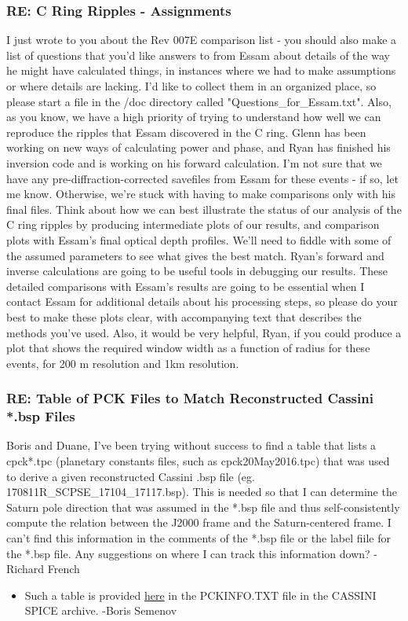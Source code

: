 \documentclass[crop=false,class=article,oneside]{standalone}
\begin{document}
\subsubsection{\footnotesize RE: C Ring Ripples - Assignments}
I just wrote to you about the Rev 007E comparison list - you should also make a list of questions that you'd like answers to from Essam about details of the way he might have calculated things, in instances where we had to make assumptions or where details are lacking. I'd like to collect them in an organized place, so please start a file in the /doc directory called "Questions\_for\_Essam.txt". Also, as you know, we have a high priority of trying to understand how well we can reproduce the ripples that Essam discovered in the C ring. Glenn has been working on new ways of calculating power and phase, and Ryan has finished his inversion code and is working on his forward calculation. I'm not sure that we have any pre-diffraction-corrected savefiles from Essam for these events - if so, let me know. Otherwise, we're stuck with having to make comparisons only with his final files. Think about how we can best illustrate the status of our analysis of the C ring ripples by producing intermediate plots of our results, and comparison plots with Essam's final optical depth profiles. We'll need to fiddle with some of the assumed parameters to see what gives the best match. Ryan's forward and inverse calculations are going to be useful tools in debugging our results. These detailed comparisons with Essam's results are going to be essential when I contact Essam for additional details about his processing steps, so please do your best to make these plots clear, with accompanying text that describes the methods you've used. Also, it would be very helpful, Ryan, if you could produce a plot that shows the required window width as a function of radius for these events, for 200 m resolution and 1km resolution.
\subsubsection{\footnotesize RE: Table of PCK Files to Match Reconstructed Cassini *.bsp Files}
Boris and Duane, I've been trying without success to find a table that lists a cpck*.tpc (planetary constants files, such as cpck20May2016.tpc) that was used to derive a given reconstructed Cassini .bsp file (eg. 170811R\_SCPSE\_17104\_17117.bsp). This is needed so that I can determine the Saturn pole direction that was assumed in the *.bsp file and thus self-consistently compute the relation between the J2000 frame and the Saturn-centered frame. I can't find this information in the comments of the *.bsp file or the label fiile for the *.bsp file. Any suggestions on where I can track this information down? -Richard French
\begin{itemize}
    \item Such a table is provided \href{https://naif.jpl.nasa.gov/pub/naif/pds/data/co-s_j_e_v-spice-6-v1.0/cosp_1000/data/pck/pckinfo.txt}{here} in the PCKINFO.TXT file in the CASSINI SPICE archive. -Boris Semenov
\end{itemize}
\end{document}
